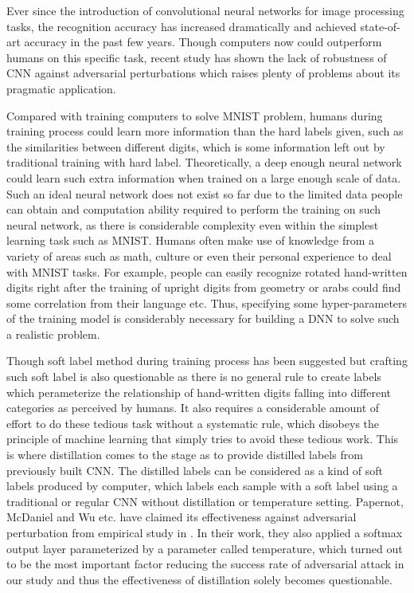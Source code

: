 \documentclass{article}
\begin{document}
Ever since the introduction of convolutional neural networks for image processing tasks, the recognition accuracy has increased dramatically and achieved state-of-art accuracy in the past few years. Though computers now could outperform humans on this specific task,
recent study has shown the lack of robustness of CNN against adversarial perturbations which raises plenty of problems about its pragmatic application. 

Compared with training computers to solve MNIST problem, humans during training process could learn more information than the hard labels given, such as the similarities between different digits, 
which is some information left out by traditional training with hard label. 
Theoretically, a deep enough neural network could learn such extra information when trained on a large enough scale of data. Such an ideal neural network does not exist so far due to the limited data people can obtain and computation ability required to perform the training on such neural network, as there is considerable complexity even within the simplest learning task such as MNIST\cite{schmid}. Humans often make use of knowledge from a variety of areas such as math, culture or even their personal experience to deal with MNIST tasks. For example, people can easily recognize rotated hand-written digits right after the training of upright digits from geometry or arabs could find some correlation from their language etc.
Thus, specifying some hyper-parameters of the training model is considerably necessary for building a DNN to solve such a realistic problem.

Though soft label method during training process has been suggested but crafting such soft label is also questionable as there is no general rule to create labels which perameterize the relationship of hand-written digits falling into different categories as perceived by humans.
It also requires a considerable amount of effort to do these tedious task without a systematic rule, which disobeys the principle of machine learning that simply tries to avoid these tedious work.
This is where distillation comes to the stage as to provide distilled labels from previously built CNN. The distilled labels can be considered as a kind of soft labels produced by computer, which labels each sample with a soft label using a traditional or regular CNN without distillation or temperature setting. 
Papernot, McDaniel and Wu etc. have claimed its effectiveness against adversarial perturbation from empirical study in \cite{Papernot}.
In their work, they also applied a softmax output layer parameterized by a parameter called temperature, which turned out to be the most important factor reducing the success rate of adversarial attack in our study and thus the effectiveness of distillation solely becomes questionable.
\end{document}
